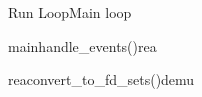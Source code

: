 \documentclass[Main]{subfiles}
\begin{document}
\begin {sequencediagram}

	\begin{sdblock}{Run Loop}{Main loop}
		\begin{messcall}{main}{handle\_events()}{rea}
			\begin{messcall}{rea}{convert\_to\_fd\_sets()}{demu}
			\end{messcall}

		\end{messcall}
		

	\end{sdblock}

\end{sequencediagram}
\end{document}
